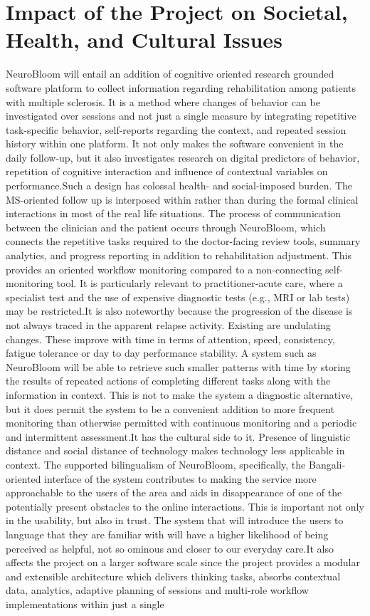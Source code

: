 \documentclass[12pt,a4paper]{report}
\begin{document}
\section{Impact of the Project on Societal, Health, and Cultural Issues}
NeuroBloom will entail an addition of cognitive oriented research grounded software platform to collect information regarding rehabilitation among patients with multiple sclerosis. It is a method where changes of behavior can be investigated over sessions and not just a single measure by integrating repetitive task-specific behavior, self-reports regarding the context, and repeated session history within one platform. It not only makes the software convenient in the daily follow-up, but it also investigates research on digital predictors of behavior, repetition of cognitive interaction and influence of contextual variables on performance\cite{insel2017,coravos2019}.Such a design has colossal health- and social-imposed burden. The MS-oriented follow up is interposed within rather than during the formal clinical interactions in most of the real life situations. The process of communication between the clinician and the patient occurs through NeuroBloom, which connects the repetitive tasks required to the doctor-facing review tools, summary analytics, and progress reporting in addition to rehabilitation adjustment. This provides an oriented workflow monitoring compared to a non-connecting self-monitoring tool. It is particularly relevant to practitioner-acute care, where a specialist test and the use of expensive diagnostic tests (e.g., MRI or lab tests) may be restricted.It is also noteworthy because the progression of the disease is not always traced in the apparent relapse activity. Existing are undulating changes. These improve with time in terms of attention, speed, consistency, fatigue tolerance or day to day performance stability. A system such as NeuroBloom will be able to retrieve such smaller patterns with time by storing the results of repeated actions of completing different tasks along with the information in context. This is not to make the system a diagnostic alternative, but it does permit the system to be a convenient addition to more frequent monitoring than otherwise permitted with continuous monitoring and a periodic and intermittent assessment.It has the cultural side to it. Presence of linguistic distance and social distance of technology makes technology less applicable in context. The supported bilingualism of NeuroBloom, specifically, the Bangali-oriented interface of the system contributes to making the service more approachable to the users of the area and aids in disappearance of one of the potentially present obstacles to the online interactions. This is important not only in the usability, but also in trust. The system that will introduce the users to language that they are familiar with will have a higher likelihood of being perceived as helpful, not so ominous and closer to our everyday care.It also affects the project on a larger software scale since the project provides a modular and extensible architecture which delivers thinking tasks, absorbs contextual data, analytics, adaptive planning of sessions and multi-role workflow implementations within just a single 
\end{document}
